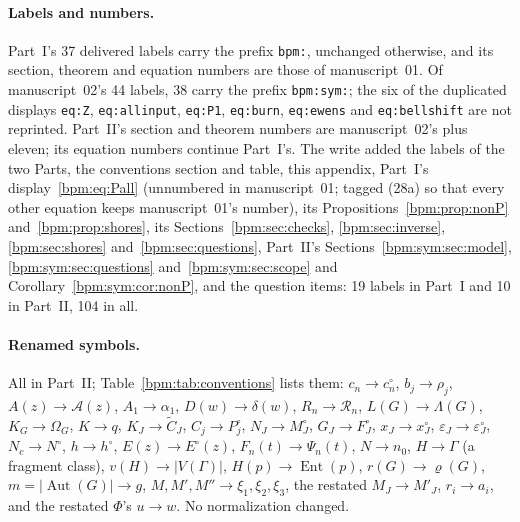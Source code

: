 \documentclass[11pt,a4paper]{article}
\theoremstyle{remark}\newtheorem{remark}[theorem]{Remark}%
\newcommand{\Aut}{\operatorname{Aut}}\newcommand{\ee}{\mathrm e}
\newcommand{\Ent}{\operatorname{Ent}}
\begin{document}
\paragraph{Labels and numbers.} Part~I's 37 delivered labels carry the
prefix \texttt{bpm:}, unchanged otherwise, and its section, theorem and
equation numbers are those of manuscript~01. Of manuscript~02's 44 labels,
38 carry the prefix \texttt{bpm:sym:}; the six of the duplicated displays
\texttt{eq:Z}, \texttt{eq:allinput}, \texttt{eq:P1}, \texttt{eq:burn},
\texttt{eq:ewens} and \texttt{eq:bellshift} are not reprinted. Part~II's
section and theorem numbers are manuscript~02's plus eleven; its equation
numbers continue Part~I's. The write added the labels of the two Parts, the
conventions section and table, this appendix, Part~I's
display~\eqref{bpm:eq:Pall} (unnumbered in manuscript~01; tagged
(28a) so that every other equation keeps manuscript~01's number), its
Propositions~\ref{bpm:prop:nonP} and~\ref{bpm:prop:shores}, its
Sections~\ref{bpm:sec:checks}, \ref{bpm:sec:inverse},
\ref{bpm:sec:shores} and~\ref{bpm:sec:questions}, Part~II's
Sections~\ref{bpm:sym:sec:model}, \ref{bpm:sym:sec:questions}
and~\ref{bpm:sym:sec:scope} and Corollary~\ref{bpm:sym:cor:nonP}, and the
question items: 19 labels in Part~I and 10 in Part~II, 104 in all.

\paragraph{Renamed symbols.} All in Part~II; Table~\ref{bpm:tab:conventions}
lists them: $c_n\to c^\circ_n$, $b_j\to\rho_j$, $A(z)\to\mathcal A(z)$,
$A_1\to\alpha_1$, $D(w)\to\delta(w)$, $R_n\to\mathcal R_n$,
$L(G)\to\Lambda(G)$, $K_G\to\Omega_G$, $K\to q$, $K_J\to\widetilde C_J$,
$C_j\to P^\circ_j$, $N_J\to M^\circ_J$, $G_J\to F^\circ_J$,
$x_J\to x^\circ_J$, $\varepsilon_J\to\varepsilon^\circ_J$,
$N_c\to N^\circ$, $h\to h^\circ$, $E(z)\to E^\circ(z)$, $F_n(t)\to\Psi_n(t)$,
$N\to n_0$, $H\to\Gamma$ (a fragment class), $v(H)\to|V(\Gamma)|$,
$H(p)\to\Ent(p)$, $r(G)\to\varrho(G)$, $m=|\Aut(G)|\to g$,
$M,M',M''\to\xi_1,\xi_2,\xi_3$, the restated $M_J\to M'_J$, $r_i\to a_i$, and
the restated $\Phi$'s $u\to w$. No normalization changed.
\end{document}
